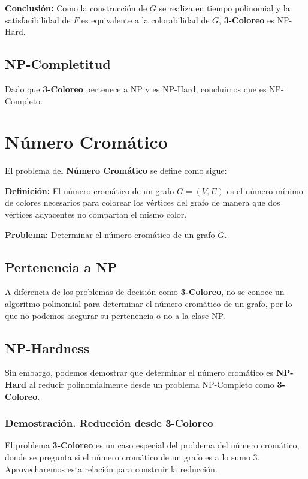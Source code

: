\documentclass[a4paper,12pt]{article}
\begin{document}
\textbf{Conclusi\'on:} Como la construcci\'on de $G$ se realiza en tiempo polinomial y la satisfacibilidad de $F$ es equivalente a la colorabilidad de $G$, \textbf{3-Coloreo} es NP-Hard.

\subsection{NP-Completitud}
Dado que \textbf{3-Coloreo} pertenece a NP y es NP-Hard, concluimos que es NP-Completo.




\section{N\'umero Crom\'atico}

El problema del \textbf{N\'umero Crom\'atico} se define como sigue:

\textbf{Definici\'on:} El n\'umero crom\'atico de un grafo $G = (V, E)$ es el n\'umero m\'inimo de colores necesarios para colorear los v\'ertices del grafo de manera que dos v\'ertices adyacentes no compartan el mismo color.

\textbf{Problema:} Determinar el n\'umero crom\'atico de un grafo $G$.

\subsection{Pertenencia a NP}

A diferencia de los problemas de decisi\'on como \textbf{3-Coloreo}, no se conoce un algoritmo polinomial para determinar el n\'umero crom\'atico de un grafo, por lo que no podemos asegurar su pertenencia o no a la clase NP.


\subsection{NP-Hardness}

Sin embargo, podemos demostrar que determinar el n\'umero crom\'atico es \textbf{NP-Hard} al reducir polinomialmente desde un problema NP-Completo como \textbf{3-Coloreo}.


\subsubsection{Demostración. Reducci\'on desde 3-Coloreo}
El problema \textbf{3-Coloreo} es un caso especial del problema del n\'umero crom\'atico, donde se pregunta si el n\'umero crom\'atico de un grafo es a lo sumo 3. Aprovecharemos esta relaci\'on para construir la reducci\'on.
\end{document}
